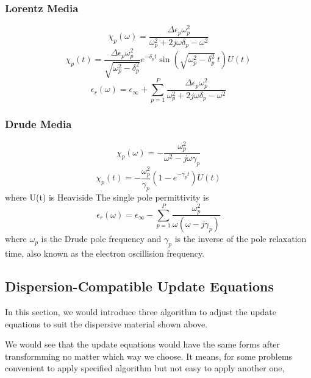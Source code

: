 \subsubsection{Lorentz Media}
\begin{equation}
  \chi_p(\omega) = \frac{\Delta\epsilon_p\omega_p^2}{\omega_p^2 + 2j\omega\delta_p - \omega^2}  
\end{equation}
\begin{equation}
  \chi_p(t) = \frac{\Delta \epsilon_p \omega_p^2}{\sqrt{\omega_p^2 - \delta_p^2}}e^{-\delta_p t}\sin\left(\sqrt{\omega_p^2-\delta_p^2}\ t\right)U(t)
\end{equation}
\begin{equation}
  \epsilon_r(\omega) = \epsilon_{\infty} + \sum_{p=1}^P \frac{\Delta\epsilon_p\omega_p^2}{\omega_p^2 + 2j\omega\delta_p - \omega^2}  
\end{equation}


\subsubsection{Drude Media}
\begin{equation}
  \chi_p(\omega) = -\frac{\omega_p^2}{\omega^2 - j\omega\gamma_p}  
\end{equation}
\begin{equation}
  \chi_p(t) = -\frac{\omega_p^2}{\gamma_p}\left(1-e^{-\gamma_p t}\right) U(t)
\end{equation}
where U(t) is Heaviside
The single pole permittivity is 
\begin{equation}
  \epsilon_r(\omega) = \epsilon_{\infty} - \sum_{p=1}^P \frac{\omega_p^2}{\omega(\omega-j\gamma_p)}
\end{equation}
where $\omega_p$ is the Drude pole frequency and $\gamma_p$ is the inverse of the pole relaxation time, also known as the
electron oscillision frequency.



\subsection{Dispersion-Compatible Update Equations}
In this section, we would introduce three algorithm to adjust the update equations to suit the dispersive material shown
above.

We would see that the update equations would have the same forms after transformming no matter which way we choose. It
means, for some problems convenient to apply specified algorithm but not easy to apply another one, 


